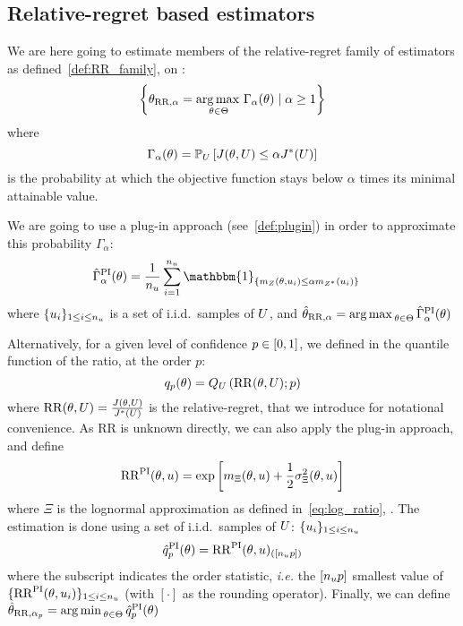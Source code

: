 \documentclass[../../Main_ManuscritThese.tex]{subfiles}
\begin{document}
\subsection{Relative-regret based estimators}
We are here going to estimate members of the relative-regret family of
estimators as defined~\cref{def:RR_family}, on
:
\begin{equation}
  \left\{\theta_{\mathrm{RR,\alpha}} = \operatorname*{arg\,max \,}_{\theta\in\Theta} \Gamma_{\alpha}(\theta) \mid \alpha \geq 1\right\}
\end{equation}
where
\begin{equation}
  \Gamma_{\alpha}(\theta) = \mathbb{P}_{U}\left[J(\theta,U) \leq \alpha J^*(U)\right]
\end{equation}
is the probability at which the objective function stays
below $\alpha$ times its minimal attainable value.


We are going to use a plug-in approach (see~\cref{def:plugin}) in
order to approximate this probability $\Gamma_{\alpha}$:
\begin{align}
  \hat{\Gamma}^{\mathrm{PI}}_{\alpha}(\kk) &= \frac{1}{n_\uu}\sum_{i=1}^{n_{\uu}} \mathbbm{1}_{\{m_Z(\kk, \uu_i) \leq \alpha m_{Z^*}(\uu_i)\}}%
\end{align}
where $\{u_i\}_{1\leq i \leq n_{u}}$  is a set of i.i.d.\ samples of $U$,
and $\hat{\theta}_{\mathrm{RR},\alpha} = \operatorname*{arg\,max \,}_{\theta \in \Theta} \hat{\Gamma}^{\mathrm{PI}}_{\alpha}(\theta)$


Alternatively, for a given level of confidence
$p \in \interval{0}{1}$, we defined in the quantile function of the
ratio, at the order $p$:
\begin{equation}
  q_p(\theta) = Q_{U}\left(\mathrm{RR}(\theta, U);p \right)
\end{equation}
where $\mathrm{RR}(\theta, U)=\frac{J(\theta, U)}{J^*(U)}$ is the
relative-regret, that we introduce for notational convenience.  As
$\mathrm{RR}$ is unknown directly, we can also apply the plug-in
approach, and define
\begin{equation}
  \mathrm{RR}^{\mathrm{PI}}(\theta, u) = \exp\left[m_{\Xi}(\theta, u) + \frac{1}{2}\sigma^2_{\Xi}(\theta, u)\right]
\end{equation}
where $\Xi$ is the lognormal approximation as defined
in~\cref{eq:log_ratio}, . The estimation is
done using a set of i.i.d.\ samples of $U$:
$\{u_i\}_{1\leq i \leq n_{u}}$
\begin{equation}
  \label{eq:RRPI}
  \hat{q}_p^{\mathrm{PI}}(\theta) = {\mathrm{RR}}^{\mathrm{PI}}(\theta, u)_{(\left[n_{u}p\right])}
\end{equation}
where the subscript indicates the order statistic, \emph{i.e.} the
$\left[n_{u}p\right]$ smallest value of
$\{\mathrm{RR}^\mathrm{PI}(\theta,u_i)\}_{1\leq i\leq n_u}$ (with
$[\cdot]$ as the rounding operator). Finally, we can define
$\hat{\theta}_{\mathrm{RR},\alpha_p} = \operatorname*{arg\,min \,}_{\theta \in \Theta}
\hat{q}_p^{\mathrm{PI}}(\theta)$
\end{document}
